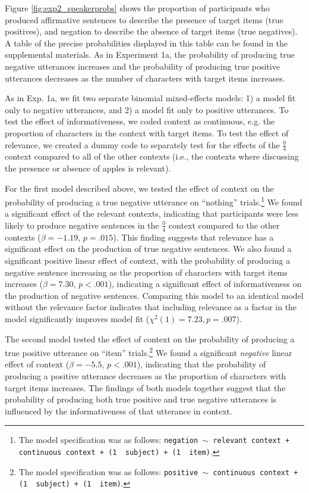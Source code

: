 \documentclass[man, floatsintext, noapacite]{apa6}
\begin{document}
Figure \ref{fig:exp2_speakerprobs} shows the proportion of participants who produced affirmative sentences to describe the presence of target items (true positives), and negation to describe the absence of target items (true negatives). A table of the precise probabilities displayed in this table can be found in the supplemental materials. As in Experiment 1a, the probability of producing true negative utterances increases and the probability of producing true positive utterances decreases as the number of characters with target items increases.

As in Exp. 1a, we fit two separate binomial mixed-effects models: 1) a model fit only to negative utterances, and 2) a model fit only to positive utterances. To test the effect of informativeness, we coded context as continuous, e.g. the proportion of characters in the context with target items. To test the effect of relevance, we created a dummy code to separately test for the effects of the  $\frac{0}{4}$ context compared to all of the other contexts (i.e., the contexts where discussing the presence or absence of apples is relevant). 

For the first model described above, we tested the effect of context on the probability of producing a true negative utterance on ``nothing'' trials.\footnote{The model specification was as follows: \texttt{negation $\sim$  relevant context + continuous context + (1~\textbar~subject) +  (1~\textbar~item)}.} We  found a significant effect of the relevant contexts, indicating that participants were less likely to produce negative sentences in the $\frac{0}{4}$ context compared to the other contexts ($\beta= -1.19$, $p = .015$). This finding suggests that relevance has a significant effect on the production of true negative sentences. We also found a significant positive linear effect of context, with the probability of producing a negative sentence increasing as the proportion of characters with target items increases ($\beta= 7.30$, $p< .001$), indicating a significant effect of informativeness on the production of negative sentences. Comparing this model to an identical model without the relevance factor indicates that including relevance as a factor in the model significantly improves model fit ($\chi^2(1)= 7.23, p = .007$). 

The second model tested the effect of context on the probability of producing a true positive utterance on ``item'' trials.\footnote{The model specification was as follows: \texttt{positive $\sim$  continuous context + (1~\textbar~subject) +  (1~\textbar~item)}.} We found a significant \textit{negative} linear effect of context ($\beta= -5.5$, $p< .001$), indicating that the probability of producing a positive utterance decreases as the proportion of characters with target items increases. The findings of both models together suggest that the probability of producing both true positive and true negative utterances is influenced by the informativeness of that utterance in context.
\end{document}
